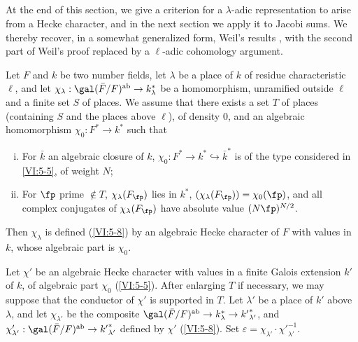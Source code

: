 \subsection{}\label{VI:5-9}

At the end of this section, we give a criterion for a 
$\lambda$-adic representation to arise from a Hecke character, 
and in the next section we apply it to Jacobi sums. We 
thereby recover, in a somewhat generalized form, Weil's results 
\cite{we52,we74-2}, with the second part of Weil's proof 
replaced by a $\ell$-adic cohomology argument. 





\begin{theorem_}\label{VI:5-10}
Let $F$ and $k$ be two number fields, let $\lambda$ be a place of $k$ of 
residue characteristic $\ell$, and let 
$\chi_\lambda:\gal(\bar F/F)^\textnormal{ab}\to k_\lambda^\ast$ be a 
homomorphism, unramified outside $\ell$ and a finite set $S$ of 
places. We assume that there exists a set $T$ of places (containing $S$ and the 
places above $\ell$), of density $0$, and an algebraic homomorphism 
$\chi_0:F^\ast \to k^\ast$ such that 
\begin{enumerate}[(i)]
  \item For $\bar k$ an algebraic closure of $k$, 
    $\chi_0:F^\ast \to k^\ast \hookrightarrow \bar k^\ast$ is of the type 
    considered in \ref{VI:5-5}, of weight $N$; 
\item For $\fp$ prime $\notin T$, $\chi_\lambda(F_\fp)$ lies in 
    $k^\ast$, $(\chi_\lambda(F_\fp))=\chi_0(\fp)$, and all complex conjugates 
    of $\chi_\lambda(F_\fp)$ have absolute value $(N \fp)^{N/2}$. 
\end{enumerate}

Then $\chi_\lambda$ is defined (\ref{VI:5-8}) by an algebraic Hecke character 
of $F$ with values in $k$, whose algebraic part is $\chi_0$. 
\end{theorem_}

Let $\chi'$ be an algebraic Hecke character with values in a 
finite Galois extension $k'$ of $k$, of algebraic part $\chi_0$ 
(\ref{VI:5-5}). After enlarging $T$ if necessary, we may suppose that the conductor of 
$\chi'$ is supported in $T$. Let $\lambda'$ be a place of $k'$ above 
$\lambda$, and let $\chi_{\lambda'}$ be the composite 
$\gal(\bar F/F)^\text{ab}\to k_\lambda^\ast \to {k'}_{\lambda'}^\ast$, and 
$\chi_{\lambda'}':\gal(\bar F/F)^\text{ab}\to {k'}_{\lambda'}^\ast$ defined 
by $\chi'$ (\ref{VI:5-8}). Set 
$\varepsilon = \chi_{\lambda'} \cdot {\chi'}_{\lambda'}^{-1}$.


